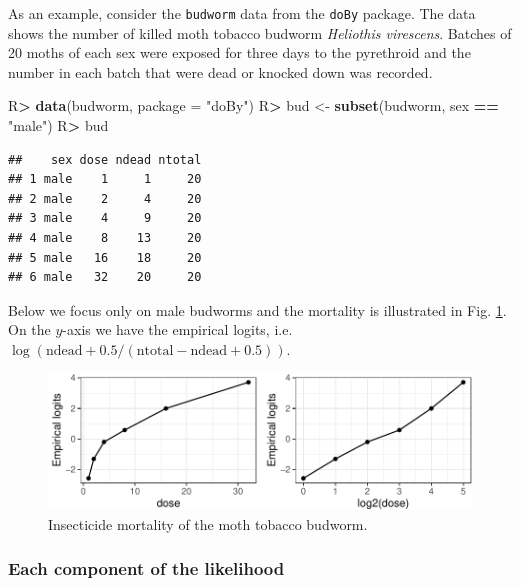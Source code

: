 \documentclass[10pt,]{article}
\newenvironment{Shaded}{\begin{snugshade}}{\end{snugshade}}
\newcommand{\DataTypeTok}[1]{\textcolor[rgb]{0.13,0.29,0.53}{#1}}
\newcommand{\KeywordTok}[1]{\textcolor[rgb]{0.13,0.29,0.53}{\textbf{#1}}}
\newcommand{\NormalTok}[1]{#1}
\newcommand{\OperatorTok}[1]{\textcolor[rgb]{0.81,0.36,0.00}{\textbf{#1}}}
\newcommand{\StringTok}[1]{\textcolor[rgb]{0.31,0.60,0.02}{#1}}
\begin{document}
As an example, consider the \texttt{budworm} data from the \texttt{doBy}
package. The data shows the number of killed moth tobacco budworm
\emph{Heliothis virescens}. Batches of 20 moths of each sex were exposed
for three days to the pyrethroid and the number in each batch that were
dead or knocked down was recorded.

\begin{Shaded}
\begin{Highlighting}[]
\NormalTok{R}\OperatorTok{>}\StringTok{ }\KeywordTok{data}\NormalTok{(budworm, }\DataTypeTok{package =} \StringTok{"doBy"}\NormalTok{)}
\NormalTok{R}\OperatorTok{>}\StringTok{ }\NormalTok{bud <-}\StringTok{ }\KeywordTok{subset}\NormalTok{(budworm, sex }\OperatorTok{==}\StringTok{ "male"}\NormalTok{)}
\NormalTok{R}\OperatorTok{>}\StringTok{ }\NormalTok{bud}
\end{Highlighting}
\end{Shaded}

\begin{verbatim}
##    sex dose ndead ntotal
## 1 male    1     1     20
## 2 male    2     4     20
## 3 male    4     9     20
## 4 male    8    13     20
## 5 male   16    18     20
## 6 male   32    20     20
\end{verbatim}

Below we focus only on male budworms and the mortality is illustrated in
Fig. \ref{fig:budworm}. On the \(y\)-axis we have the empirical logits,
i.e.~\(\log(\text{ndead} + 0.5 /(\text{ntotal}-\text{ndead} + 0.5))\).

\begin{figure}
\centering
\includegraphics{rcas_files/figure-latex/budworm-1.pdf}
\caption{\label{fig:budworm}Insecticide mortality of the moth tobacco
budworm.}
\end{figure}

\hypertarget{sec:logistic-each-component}{%
\subsubsection{Each component of the
likelihood}\label{sec:logistic-each-component}}
\end{document}
